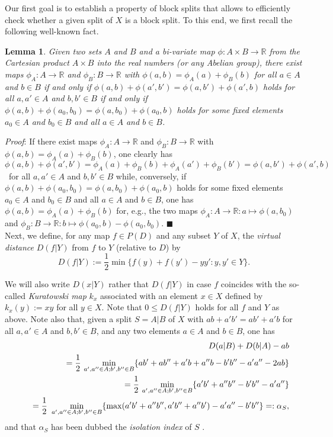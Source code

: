 \documentclass[12pt]{article}
\newtheorem{lemma}[prop]{Lemma}
\newcommand{\R}{{\mathbb R}}
\newcommand{\ra}{\rightarrow}
\begin{document}
Our first goal is to establish a property of block splits
that allows to efficiently check whether a given split
of \(X\) is a block split. To this end, we first recall the 
following well-known fact.

\begin{lemma}
\label{lemma:bivariate:map}
Given two sets $A$ and $B$ and a bi-variate map $\phi: A \times B\ra \R$ from the Cartesian product
$A \times B$ into the real numbers (or any Abelian group), there exist maps $\phi_A: A \ra \R$ and $\phi_B: B \ra \R$ with $\phi(a,b)=\phi_A(a)+ \phi_B(b)$ for all $a\in A$ and $b\in B$ if and only if 
$\phi(a,b) + \phi(a',b') = \phi(a,b') + \phi(a',b)$ holds for all $a,a'\in A$ and $b,b'\in B$ if and only if 
$\phi(a,b) + \phi(a_0,b_0) = \phi(a,b_0) + \phi(a_0,b)$ holds for some fixed elements $a_0\in A$ and $b_0\in B$ and all $a\in A$ and $b\in B$.
\end{lemma}

\noindent\textsl{Proof}:
If  there exist maps $\phi_A: A \ra \R$ and $\phi_B: B \ra \R$ with $\phi(a,b)=\phi_A(a)+ \phi_B(b)$, one clearly has $\phi(a,b) + \phi(a',b') = \phi_A(a)+ \phi_B(b)+\phi_A(a')+ \phi_B(b')=
\phi(a,b') + \phi(a',b)$ \ for all $a,a'\in A$ and $b,b'\in B$ while, conversely, if 
$\phi(a,b) + \phi(a_0,b_0) = \phi(a,b_0) + \phi(a_0,b)$ holds for some fixed elements $a_0\in A$ and $b_0\in B$ and all $a\in A$ and $b\in B$, one has 
 $\phi(a,b)=\phi_A(a)+ \phi_B(b)$ for, e.g., the two maps $\phi_A: A \ra \R: a \mapsto \phi(a,b_0)$ and 
$\phi_B: B \ra \R: b \mapsto \phi(a_0,b)-\phi(a_0,b_0)$. 
\hfill\(\blacksquare\)\\

Next, we define, for any map $f\in P(D)$ and any subset $Y$ of $X$, the \emph{virtual distance} $D(f|Y)$ from $f$ to $Y$ (relative to $D$) by
$$ 
D(f|Y):=\frac{1}{2} \min\{f(y)+f(y') - yy': y,y' \in Y\}.$$ 

We will also write $D(x|Y)$ rather that $D(f|Y)$ in case $f$ coincides with the so-called \emph{Kuratowski map} $k_x$ 
\cite{kuratowski:non:separable:metric:spaces:1935} associated with an element $x\in X $ defined by $k_x(y):=xy$ for all $y\in X$.
Note that $0\le D(f|Y) $ holds for all $f$ and $Y$ as above. Note also that, given a split $S=A|B$ of $X$ 
with $ab+a'b'=ab'+a'b$ for all $a,a'\in A$ and $b,b'\in B$, and any two elements $a\in A$ and $b\in B$, one has    
\begin{eqnarray}
\label{definition:isolation:index}
&&D(a|B) + D(b|A) - ab\\
&&\,\,\,\,= 
\frac{1}{2} \ { \min_{ a',a''\in A; b',b'' \in B} }\{ab'+ab'' + a'b + a''b- b'b'' -a'a'' - 2ab \} \notag\\
&&\,\,\,\,= 
\frac{1}{2} \ { \min_{ a',a''\in A; b',b'' \in B} }\{a'b'+a''b''  - b'b'' -a'a''  \} \notag\\
&&\,\,\,\,= \frac{1}{2} \ \min_{a',a'' \in A; b',b''\in B}\{\max(a'b'+a''b'', a'b''+a''b')- a'a''-b'b''\} =: \alpha_S, \notag
\end{eqnarray}
and that $\alpha_S$ has been dubbed the
\emph{isolation index} of $S$ \cite{bandelt:dress:canonical:1992}. 
\end{document}
